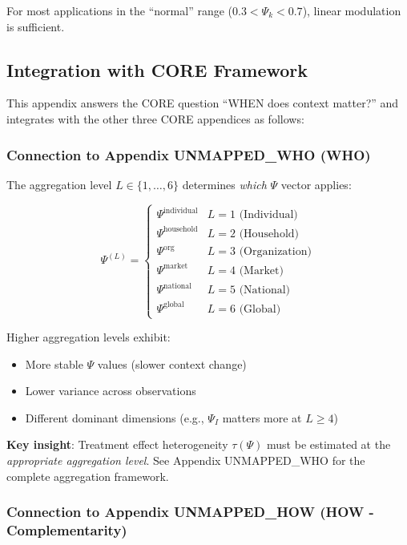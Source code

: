 For most applications in the ``normal'' range ($0.3 < \Psi_k < 0.7$), 
linear modulation is sufficient.



\subsection{Integration with CORE Framework}
\label{sec:V-core-integration}

This appendix answers the CORE question ``WHEN does context matter?'' and 
integrates with the other three CORE appendices as follows:

\subsubsection{Connection to Appendix UNMAPPED_WHO (WHO)}

The aggregation level $L \in \{1, \ldots, 6\}$ determines \textit{which} $\Psi$ 
vector applies:

\begin{equation}
\Psi^{(L)} = \begin{cases}
\Psi^{\text{individual}} & L = 1 \text{ (Individual)} \\
\Psi^{\text{household}} & L = 2 \text{ (Household)} \\
\Psi^{\text{org}} & L = 3 \text{ (Organization)} \\
\Psi^{\text{market}} & L = 4 \text{ (Market)} \\
\Psi^{\text{national}} & L = 5 \text{ (National)} \\
\Psi^{\text{global}} & L = 6 \text{ (Global)}
\end{cases}
\end{equation}

Higher aggregation levels exhibit:
\begin{itemize}
    \item More stable $\Psi$ values (slower context change)
    \item Lower variance across observations
    \item Different dominant dimensions (e.g., $\Psi_I$ matters more at $L \geq 4$)
\end{itemize}

\textbf{Key insight}: Treatment effect heterogeneity $\tau(\Psi)$ must be estimated 
at the \textit{appropriate aggregation level}. See Appendix UNMAPPED_WHO for the complete 
aggregation framework.

\subsubsection{Connection to Appendix UNMAPPED_HOW (HOW - Complementarity)}

